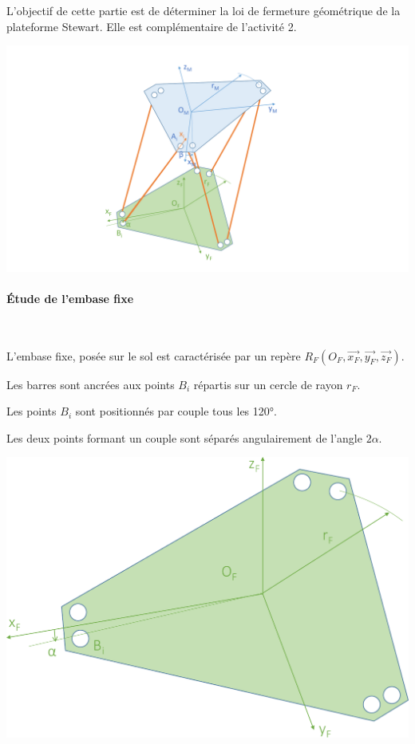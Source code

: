 



L'objectif de cette partie est de déterminer la loi de fermeture géométrique de la plateforme Stewart. Elle est complémentaire de l'activité 2.

\begin{center}
 \includegraphics[width=0.8\linewidth]{img/Stewart_cin1}
\end{center}

\paragraph{Étude de l'embase fixe} ~\ \\

\begin{minipage}{0.48\linewidth}
L'embase fixe, posée sur le sol est caractérisée par un repère $R_F(O_F,\overrightarrow{x_F},\overrightarrow{y_F},\overrightarrow{z_F})$. 

Les barres sont ancrées aux points $B_i$ répartis sur un cercle de rayon $r_F$.

Les points $B_i$ sont positionnés par couple tous les 120°.

Les deux points formant un couple sont séparés angulairement de l'angle $2\alpha$.
\end{minipage}\hfill
\begin{minipage}{0.5\linewidth}
\begin{center}
 \includegraphics[width=0.7\linewidth]{img/Stewart_cin3}
\end{center}
\end{minipage}

